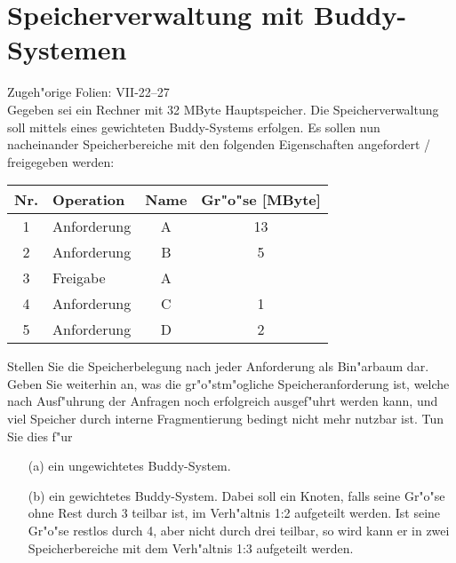 \section{Speicherverwaltung mit Buddy-Systemen}

Zugeh"orige Folien:  VII-22--27 \\

Gegeben sei ein Rechner mit 32 MByte Hauptspeicher.  Die
Speicherverwaltung soll mittels eines gewichteten Buddy-Systems
erfolgen.  Es sollen nun nacheinander Speicherbereiche mit den
folgenden Eigenschaften angefordert / freigegeben werden:

\begin{center}
  \begin{tabular}{|c|l|c|c|}
    \hline
    Nr. & Operation   & Name & Gr"o"se [MByte] \\
    \hline \hline
    1   & Anforderung & A    & 13 \\
    2   & Anforderung & B    & 5  \\
    3   & Freigabe    & A    &    \\
    4   & Anforderung & C    & 1  \\
    5   & Anforderung & D    & 2  \\
    \hline
  \end{tabular}
\end{center}

Stellen Sie die Speicherbelegung nach jeder Anforderung als Bin"arbaum
dar.  Geben Sie weiterhin an, was die gr"o"stm"ogliche
Speicheranforderung ist, welche nach Ausf"uhrung der Anfragen noch
erfolgreich ausgef"uhrt werden kann, und viel Speicher durch interne
Fragmentierung bedingt nicht mehr nutzbar ist.  Tun Sie dies f"ur

\begin{enumerate}
\item[(a)] ein ungewichtetes Buddy-System.
  
\item[(b)] ein gewichtetes Buddy-System.  Dabei soll ein Knoten, falls
  seine Gr"o"se ohne Rest durch 3 teilbar ist, im Verh"altnis 1:2
  aufgeteilt werden.  Ist seine Gr"o"se restlos durch 4, aber nicht
  durch drei teilbar, so wird kann er in zwei Speicherbereiche mit dem
  Verh"altnis 1:3 aufgeteilt werden.
\end{enumerate}
